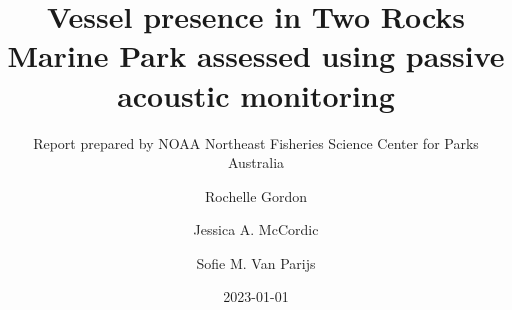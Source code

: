\documentclass[
  letterpaper,
  oneside,
  open=any]{scrbook}
\title{Vessel presence in Two Rocks Marine Park assessed using passive
acoustic monitoring}
\subtitle{Report prepared by NOAA Northeast Fisheries Science Center for
Parks Australia}
\author{Rochelle Gordon \and Jessica A. McCordic \and Sofie M. Van
Parijs}
\date{2023-01-01}
\begin{document}

  \begin{frontmatter}

\begin{titlepage}


\newcommand{\titlepagepagealign}{
\ifthenelse{\equal{left}{right}}{\raggedleft}{}
\ifthenelse{\equal{left}{center}}{\centering}{}
\ifthenelse{\equal{left}{left}}{\raggedright}{}
}
\newcommand{\titlepagetitlealign}{
\ifthenelse{\equal{left}{right}}{\raggedleft}{}
\ifthenelse{\equal{left}{center}}{\centering}{}
\ifthenelse{\equal{left}{left}}{\raggedright}{}
\ifthenelse{\equal{left}{spread}}{\makebox[\linewidth][s]}{}
}


\newcommand{\titleandsubtitle}{
{\fontsize{30}{36.0}\selectfont
\textcolor{nmfsblue1}{\bfseries{\nohyphens{Vessel presence in Two Rocks
Marine Park assessed using passive acoustic monitoring}}}\par
}%

\vspace{\betweentitlesubtitle}
{
{\textit{\nohyphens{Report prepared by NOAA Northeast Fisheries Science
Center for Parks Australia}}}\par
}}
\newcommand{\titlepagetitleblock}{
\titleandsubtitle
}

\newcommand{\authorstyle}[1]{{\fontsize{20}{24.0}\selectfont
#1}}

\newcommand{\affiliationstyle}[1]{{#1}}

\newcommand{\titlepageauthorblock}{
{\authorstyle{\nohyphens{Rochelle
Gordon}{\textsuperscript{1}}\textsuperscript{,}{\textsuperscript{2}},  \nohyphens{Jessica
A. McCordic}{\textsuperscript{1}} and \nohyphens{Sofie M. Van
Parijs}{\textsuperscript{1}}}}}

\newcommand{\titlepageaffiliationblock}{
\hangindent=1em
\hangafter=1
{\affiliationstyle{
{1}.~Northeast Fisheries Science Center,~Protected Species Division,~166
Water StreetWoods Hole, Massachusetts 02543
\par\hangindent=1em\hangafter=1{2}.~Azura Consulting, LLC.


\vspace{1\baselineskip} 
}}
}
\newcommand{\headerstyled}{%
{}
}
\newcommand{\footerstyled}{%
{}
}
\newcommand{\datestyled}{%
{2023-01-01}
}


\newcommand{\titlepageheaderblock}{\headerstyled}


\end{titlepage}
\end{frontmatter}
\end{document}
